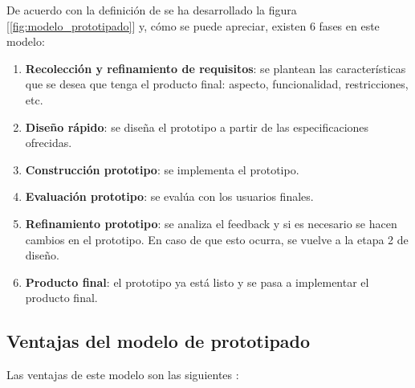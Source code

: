 De acuerdo con la definición de \cite{modeloProtitipos} se ha desarrollado la figura [\ref{fig:modelo_prototipado}] y, cómo se puede apreciar, existen 6 fases en este modelo:

\begin{enumerate}
    \item \textbf{Recolección y refinamiento de requisitos}: se plantean las características que se desea que tenga el producto final: aspecto, funcionalidad, restricciones, etc. 
    \item \textbf{Diseño rápido}: se diseña el prototipo a partir de las especificaciones ofrecidas.
    \item \textbf{Construcción prototipo}: se implementa el prototipo.
    \item \textbf{Evaluación prototipo}: se evalúa con los usuarios finales.
    \item \textbf{Refinamiento prototipo}: se analiza el feedback y si es necesario se hacen cambios en el prototipo. En caso de que esto ocurra, se vuelve a la etapa 2 de diseño.
    \item \textbf{Producto final}: el prototipo ya está listo y se pasa a implementar el producto final.
\end{enumerate}

\subsection{Ventajas del modelo de prototipado}
Las ventajas de este modelo son las siguientes \cite{modeloPrototipos1, modeloPrototipos2, ventajasDesventajasPrototipos}: 

